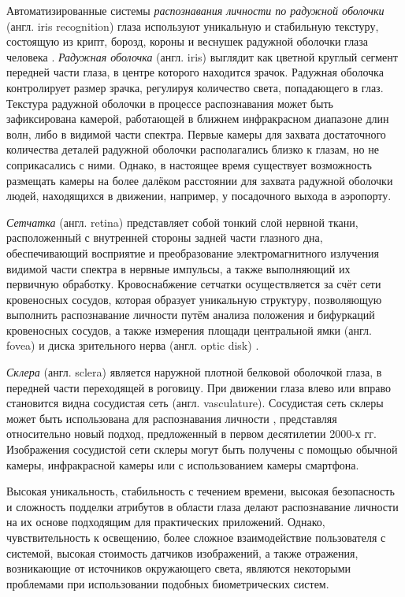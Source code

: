 \documentclass[12pt]{book}
\begin{document}
\large{Автоматизированные системы \textit{распознавания личности по радужной оболочки} (англ. iris recognition) глаза используют уникальную и стабильную текстуру, состоящую из крипт, борозд, короны и веснушек радужной оболочки глаза человека \cite{unar_2014, minaee_2023, nguyen_2024}. \textit{Радужная оболочка} (англ. iris) выглядит как цветной круглый сегмент передней части глаза, в центре которого находится зрачок. Радужная оболочка контролирует размер зрачка, регулируя количество света, попадающего в глаз. Текстура радужной оболочки в процессе распознавания может быть зафиксирована камерой, работающей в ближнем инфракрасном диапазоне длин волн, либо в видимой части спектра. Первые камеры для захвата достаточного количества деталей радужной оболочки располагались близко к глазам, но не соприкасались с ними. Однако, в настоящее время существует возможность размещать камеры на более далёком расстоянии для захвата радужной оболочки людей, находящихся в движении, например, у посадочного выхода в аэропорту.}

\large{\textit{Сетчатка} (англ. retina) представляет собой тонкий слой нервной ткани, расположенный с внутренней стороны задней части глазного дна, обеспечивающий восприятие и преобразование электромагнитного излучения видимой части спектра в нервные импульсы, а также выполняющий их первичную обработку. Кровоснабжение сетчатки осуществляется за счёт сети кровеносных сосудов, которая образует уникальную структуру, позволяющую выполнить распознавание личности путём анализа положения и бифуркаций кровеносных сосудов, а также измерения площади центральной ямки (англ. fovea) и диска зрительного нерва (англ. optic disk) \cite{unar_2014}.}

\large{\textit{Склера} (англ. sclera) является наружной плотной белковой оболочкой глаза, в передней части переходящей в роговицу. При движении глаза влево или вправо становится видна сосудистая сеть (англ. vasculature). Сосудистая сеть склеры может быть использована для распознавания личности \cite{unar_2014, rot_2020, derakhshani_2006}, представляя относительно новый подход, предложенный в первом десятилетии 2000-х гг. Изображения сосудистой сети склеры могут быть получены с помощью обычной камеры, инфракрасной камеры или с использованием камеры смартфона.}

\large{Высокая уникальность, стабильность с течением времени, высокая безопасность и сложность подделки атрибутов в области глаза делают распознавание личности на их основе подходящим для практических приложений. Однако, чувствительность к освещению, более сложное взаимодействие пользователя с системой, высокая стоимость датчиков изображений, а также отражения, возникающие от источников окружающего света, являются некоторыми проблемами при использовании подобных биометрических систем.}
\end{document}
